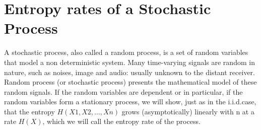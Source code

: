 \documentclass[10pt,twocolumn,letterpaper]{article}
\begin{document}



\maketitle



\section{Entropy rates of a Stochastic Process}


A stochastic process, also called a random process, is a set of random variables that model a non deterministic system.  Many time-varying signals are random in nature, such as noises, image and audio: usually unknown to the distant receiver. Random process (or stochastic process) presents the mathematical model of these random signals. If the random variables are dependent or in particular, if the random variables form a stationary process, we will show, just as in the i.i.d.case, that the entropy
\begin{math}H (X 1 , X 2 , \dots , X n )\end{math} grows (asymptotically) linearly with n at a rate \begin{math}H ( X )\end{math}, which we will call the entropy rate of the process.
\end{document}
